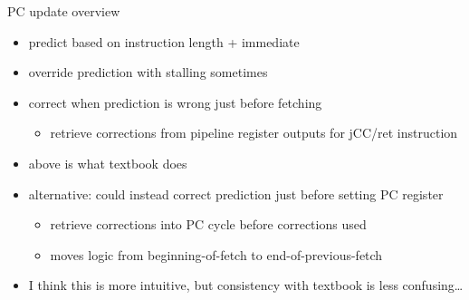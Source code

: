 \begin{frame}{PC update overview}
    \begin{itemize}
    \item predict based on instruction length + immediate
    \item override prediction with stalling sometimes
    \item correct when prediction is wrong just before fetching
        \begin{itemize}
        \item retrieve corrections from pipeline register outputs for jCC/ret instruction
        \end{itemize}
    \vspace{.5cm}
    \item above is what textbook does
    \item alternative: could instead correct prediction just before setting PC register
        \begin{itemize}
        \item retrieve corrections into PC cycle before corrections used
        \item moves logic from beginning-of-fetch to end-of-previous-fetch
        \end{itemize}
    \item {\small I think this is more intuitive, but consistency with textbook is less confusing\ldots}
    \end{itemize}
\end{frame}
